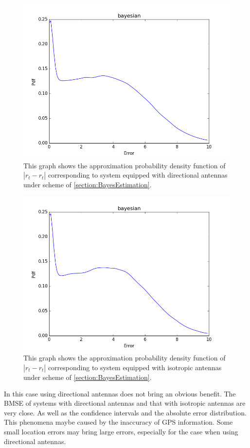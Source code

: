 \begin{figure}[]
	\centering
	\includegraphics[scale=0.5]{Figures/bayesdirex.png}
	\caption{This graph shows the approximation probability density function of $|r_{t}-\hat{r_{t}}|$ corresponding to system equipped with directional antennas under scheme of \ref{section:BayesEstimation}. }
	\label{figure: bayesdirex}
\end{figure}
\begin{figure}[]
	\centering
	\includegraphics[scale=0.5]{Figures/bayesomniex.png}
	\caption{This graph shows the approximation probability density function of $|r_{t}-\hat{r_{t}}|$ corresponding to system equipped with isotropic antennas under scheme of \ref{section:BayesEstimation}. }
	\label{figure: bayesomniex}
\end{figure}
In this case using directional antennas does not bring an obvious benefit. The BMSE of systems with directional antennas and that with isotropic antennas are very close. As well as the confidence intervals and the absolute error distribution. This phenomena maybe caused by the inaccuracy of GPS information. Some small location errors may bring large errors, especially for the case when using directional antennas. 
